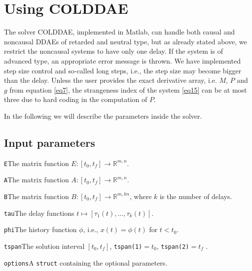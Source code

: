 \documentclass[final,reqno]{siamltex}
\renewenvironment{itemize}[1]{\begin{compactitem}#1}{\end{compactitem}}
\begin{document}
\section{Using COLDDAE}

The solver COLDDAE, implemented in Matlab, can handle both causal and noncausal DDAEs of retarded and neutral type, but as already stated above, we restrict the noncausal systems to have only one delay. If the system is of advanced type, an appropriate error message is thrown.
We have implemented step size control and so-called long steps, i.e.,  the step size may become bigger than the delay. 
Unless the user provides the exact derivative array, i.e. $M$, $P$ and $g$ from equation \eqref{eq7}, the strangeness index of the system \eqref{eq15} can be at most three due to hard coding in the computation of $P$.

In the following we will describe the parameters inside the solver.

\subsection{Input parameters}
\begin{itemize}
\item {\tt E}\quad The matrix function $E:[t_0,t_f]\rightarrow \mathbb{R}^{m,n}$.
\item {\tt A}\quad The matrix function $A:[t_0,t_f]\rightarrow \mathbb{R}^{m,n}$.
\item {\tt B}\quad The matrix function $B:[t_0,t_f]\rightarrow \mathbb{R}^{m,kn}$, where $k$ is the number of delays.
\item {\tt tau}\quad  The delay functions $t\mapsto [\tau_1(t),\ldots,\tau_k(t)]$.
\item {\tt phi}\quad The history function $\phi$, i.e.,  $x(t)=\phi(t)$ for $t < t_0$.
\item {\tt tspan}\quad The solution interval $[t_0,t_f]$, {\tt tspan(1)}$ = t_0$, {\tt tspan(2)}$ = t_f$ .
\item {\tt options}\quad A {\tt struct} containing the optional parameters.
\end{itemize}
\end{document}
